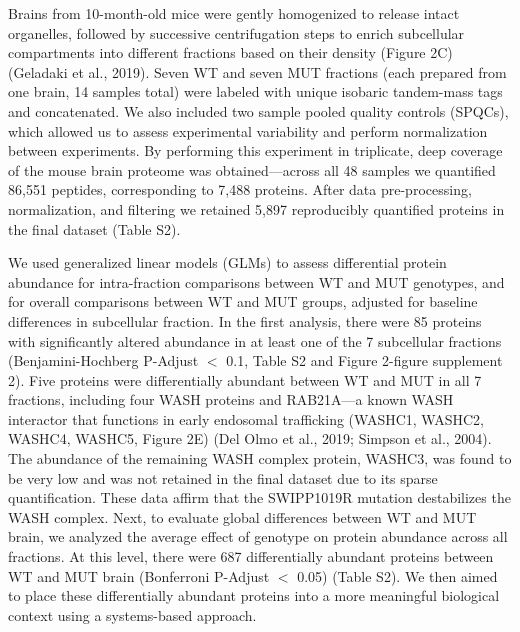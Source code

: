 Brains from 10-month-old mice were gently homogenized to release intact
organelles, followed by successive centrifugation steps to enrich subcellular
compartments into different fractions based on their density (Figure 2C)
(Geladaki et al., 2019). Seven WT and seven MUT fractions (each prepared from
one brain, 14 samples total) were labeled with unique isobaric tandem-mass tags
and concatenated. We also included two sample pooled quality controls (SPQCs),
which allowed us to assess experimental variability and perform normalization
between experiments. By performing this experiment in triplicate, deep coverage
of the mouse brain proteome was obtained—across all 48 samples we quantified
86,551 peptides, corresponding to 7,488 proteins. After data pre-processing,
normalization, and filtering we retained 5,897 reproducibly quantified proteins
in the final dataset (Table S2). 

We used generalized linear models (GLMs) to assess differential protein
abundance for intra-fraction comparisons between WT and MUT genotypes, and for
overall comparisons between WT and MUT groups, adjusted for baseline differences
in subcellular fraction. In the first analysis, there were 85 proteins with
significantly altered abundance in at least one of the 7 subcellular fractions
(Benjamini-Hochberg P-Adjust $<$ 0.1, Table S2 and Figure 2-figure supplement 2).
Five proteins were differentially abundant between WT and MUT in all 7
fractions, including four WASH proteins and RAB21A—a known WASH interactor that
functions in early endosomal trafficking (WASHC1, WASHC2, WASHC4, WASHC5, Figure
2E) (Del Olmo et al., 2019; Simpson et al., 2004). The abundance of the
remaining WASH complex protein, WASHC3, was found to be very low and was not
retained in the final dataset due to its sparse quantification. These data
affirm that the SWIPP1019R mutation destabilizes the WASH complex. Next, to
evaluate global differences between WT and MUT brain, we analyzed the average
effect of genotype on protein abundance across all fractions. At this level,
there were 687 differentially abundant proteins between WT and MUT brain
(Bonferroni P-Adjust $<$ 0.05) (Table S2). We then aimed to place these
differentially abundant proteins into a more meaningful biological context using
a systems-based approach.

